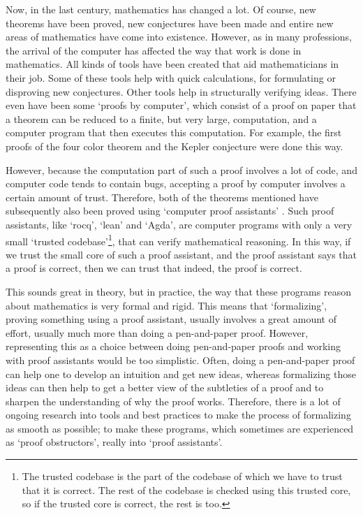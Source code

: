 Now, in the last century, mathematics has changed a lot. Of course, new theorems have been proved, new conjectures have been made and entire new areas of mathematics have come into existence. However, as in many professions, the arrival of the computer has affected the way that work is done in mathematics. All kinds of tools have been created that aid mathematicians in their job. Some of these tools help with quick calculations, for formulating or disproving new conjectures. Other tools help in structurally verifying ideas. There even have been some `proofs by computer', which consist of a proof on paper that a theorem can be reduced to a finite, but very large, computation, and a computer program that then executes this computation. For example, the first proofs of the four color theorem \autocite{four-color-theorem} and the Kepler conjecture \autocite{Kepler-conjecture} were done this way.

However, because the computation part of such a proof involves a lot of code, and computer code tends to contain bugs, accepting a proof by computer involves a certain amount of trust. Therefore, both of the theorems mentioned have subsequently also been proved using `computer proof assistants' \autocite{formalized-four-color-theorem}\autocite{formalized-Kepler-conjecture}. Such proof assistants, like `rocq', `lean' and `Agda', are computer programs with only a very small `trusted codebase'\footnote{The trusted codebase is the part of the codebase of which we have to trust that it is correct. The rest of the codebase is checked using this trusted core, so if the trusted core is correct, the rest is too.}, that can verify mathematical reasoning. In this way, if we trust the small core of such a proof assistant, and the proof assistant says that a proof is correct, then we can trust that indeed, the proof is correct.

This sounds great in theory, but in practice, the way that these programs reason about mathematics is very formal and rigid. This means that `formalizing', proving something using a proof assistant, usually involves a great amount of effort, usually much more than doing a pen-and-paper proof. However, representing this as a choice between doing pen-and-paper proofs and working with proof assistants would be too simplistic. Often, doing a pen-and-paper proof can help one to develop an intuition and get new ideas, whereas formalizing those ideas can then help to get a better view of the subtleties of a proof and to sharpen the understanding of why the proof works. Therefore, there is a lot of ongoing research into tools and best practices to make the process of formalizing as smooth as possible; to make these programs, which sometimes are experienced as `proof obstructors', really into `proof assistants'.

